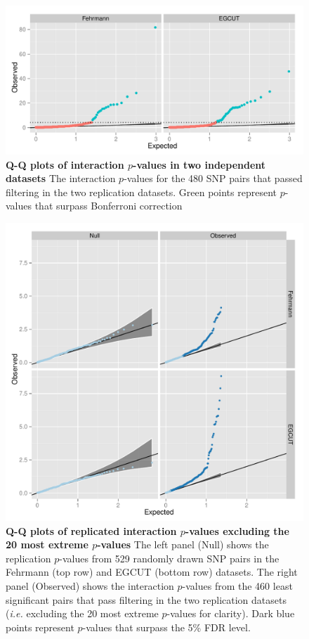 \documentclass{article}
\begin{document}
\begin{figure}[H]
\includegraphics[width=5in]{qqbonf}
\caption{\textbf{Q-Q plots of interaction $p$-values in two independent datasets} The interaction $p$-values for the 480 SNP pairs that passed filtering in the two replication datasets. Green points represent $p$-values that surpass Bonferroni correction}
\label{fig:qqplotbonf}
\end{figure}

\begin{figure}
\includegraphics[width=5in]{qqfdr}
\caption{\textbf{Q-Q plots of replicated interaction $p$-values excluding the 20 most extreme $p$-values} The left panel (Null) shows the replication $p$-values from 529 randomly drawn SNP pairs in the Fehrmann (top row) and EGCUT (bottom row) datasets. The right panel (Observed) shows the interaction $p$-values from the 460 least significant pairs that pass filtering in the two replication datasets (\emph{i.e.} excluding the 20 most extreme $p$-values for clarity). Dark blue points represent $p$-values that surpass the 5\% FDR level.}
\label{fig:qqplotfdr}
\end{figure}

\begin{figure}
\caption{\textbf{}}
\end{figure}
\end{document}

